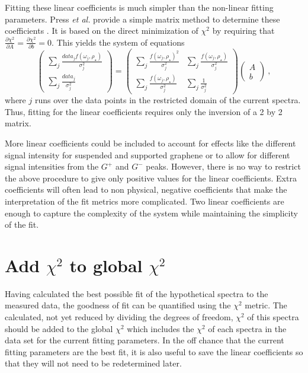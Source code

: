 Fitting these linear coefficients is much simpler than the non-linear fitting parameters.
Press \emph{et al.} provide a simple matrix method to determine these coefficients \cite{Press2007}.
It is based on the direct minimization of $\chi^2$ by requiring that $\frac{\partial \chi^2}{\partial A}=\frac{\partial \chi^2}{\partial b}=0$.
This yields the system of equations
\begin{equation*}
	\left( \begin{array}{c}
		\sum_j \frac{data_j f(\omega_j,\rho_{\star})}{\sigma_j^2} \\
		\sum_j \frac{data_j                          }{\sigma_j^2}
	\end{array} \right)
	=
	\left( \begin{array}{cc}
		\sum_j \frac{f(\omega_j,\rho_{\star})^2}{\sigma_j^2} & \sum_j \frac{f(\omega_j,\rho_{\star})}{\sigma_j^2} \\
		\sum_j \frac{f(\omega_j,\rho_{\star})}{\sigma_j^2} & \sum_j \frac{1}{\sigma_j^2}
	\end{array} \right)
	\left( \begin{array}{c}
		A \\
		b
	\end{array} \right) \ ,
\end{equation*} 
where $j$ runs over the data points in the restricted domain of the current spectra.
Thus, fitting for the linear coefficients requires only the inversion of a 2 by 2 matrix.

More linear coefficients could be included to account for effects like the different signal intensity for suspended and supported graphene or to allow for different signal intensities from the $G^+$ and $G^-$ peaks.
However, there is no way to restrict the above procedure to give only positive values for the linear coefficients.
Extra coefficients will often lead to non physical, negative coefficients that make the interpretation of the fit metrics more complicated.
Two linear coefficients are enough to capture the complexity of the system while maintaining the simplicity of the fit.

\section*{Add $\chi^2$ to global $\chi^2$}
Having calculated the best possible fit of the hypothetical spectra to the measured data, the goodness of fit can be quantified using the $\chi^2$ metric.
The calculated, not yet reduced by dividing the degrees of freedom, $\chi^2$ of this spectra should be added to the global $\chi^2$ which includes the $\chi^2$ of each spectra in the data set for the current fitting parameters.
In the off chance that the current fitting parameters are the best fit, it is also useful to save the linear coefficients so that they will not need to be redetermined later.

